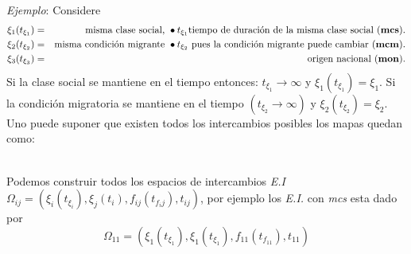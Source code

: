 \documentclass[]{article}
\begin{document}
\emph{Ejemplo}: Considere
\begin{eqnarray*}
\xi_1(t_{\xi_1})&=&\text{misma clase social, } \bullet t_{\xi_1} \text{tiempo de duraci\'on de la misma clase social (\textbf{mcs}).}\\
\xi_2(t_{\xi_2})&=&\text{misma condici\'on migrante }\bullet t_{\xi_2} \text{ pues la condici\'on migrante puede cambiar (\textbf{mcm})}.\\
\xi_3(t_{\xi_3})&=&\text{origen nacional (\textbf{mon})}.
\end{eqnarray*} 
Si la clase social se mantiene en el tiempo entonces: $t_{\xi_1}\longrightarrow\infty$ y $\xi_1(t_{\xi_1})=\xi_1$. Si la condici\'on migratoria se mantiene en el tiempo $(t_{\xi_2}\longrightarrow\infty)$ y $\xi_2(t_{\xi_2})=\xi_2$. Uno puede suponer que existen todos los intercambios posibles los mapas quedan como:\\ \\

\begin{center}
\end{center}

Podemos construir todos los espacios de intercambios \emph{E.I} $\Omega_{ij}=(\xi_i(t_{\xi_i}), \xi_j(t_i), f_{ij}(t_{f_ij}), t_{ij} )$, por ejemplo los \emph{E.I.} con \emph{mcs} esta dado por  
\begin{equation*}
\Omega_{11}=(\xi_1(t_{\xi_1}), \xi_1(t_{\xi_1}), f_{11}(t_{f_{11}}), t_{11})
\end{equation*}
\end{document}
